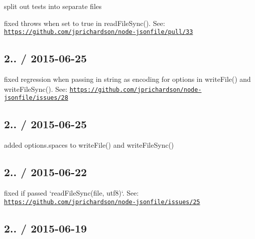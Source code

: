 
\begin{DoxyItemize}
\item split out tests into separate files
\item fixed {\ttfamily throws} when set to {\ttfamily true} in {\ttfamily read\+File\+Sync()}. See\+: \href{https://github.com/jprichardson/node-jsonfile/pull/33}{\tt https\+://github.\+com/jprichardson/node-\/jsonfile/pull/33}
\end{DoxyItemize}

\subsection*{2.. / 2015-\/06-\/25 }


\begin{DoxyItemize}
\item fixed regression when passing in string as encoding for options in {\ttfamily write\+File()} and {\ttfamily write\+File\+Sync()}. See\+: \href{https://github.com/jprichardson/node-jsonfile/issues/28}{\tt https\+://github.\+com/jprichardson/node-\/jsonfile/issues/28}
\end{DoxyItemize}

\subsection*{2.. / 2015-\/06-\/25 }


\begin{DoxyItemize}
\item added {\ttfamily options.\+spaces} to {\ttfamily write\+File()} and {\ttfamily write\+File\+Sync()}
\end{DoxyItemize}

\subsection*{2.. / 2015-\/06-\/22 }


\begin{DoxyItemize}
\item fixed if passed `read\+File\+Sync(file, \textquotesingle{}utf8\textquotesingle{})`. See\+: \href{https://github.com/jprichardson/node-jsonfile/issues/25}{\tt https\+://github.\+com/jprichardson/node-\/jsonfile/issues/25}
\end{DoxyItemize}

\subsection*{2.. / 2015-\/06-\/19 }


